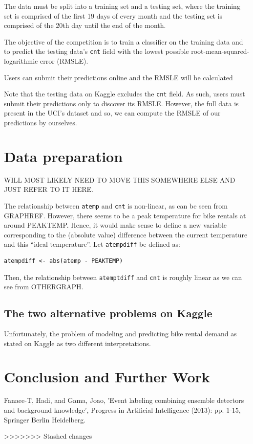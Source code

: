 \documentclass[12pt]{article}
\begin{document}
The data must be split into a training set and a testing set, where the training set is comprised of the first 19 days of every month and the testing set is comprised of the 20th day until the end of the month.

The objective of the competition is to train a classifier on the training data and to predict the testing data's \texttt{cnt} field with the lowest possible root-mean-squared-logarithmic error (RMSLE).

Users can submit their predictions online and the RMSLE will be calculated

Note that the testing data on Kaggle excludes the \texttt{cnt} field. As such, users must submit their predictions only to discover its RMSLE. However, the full data is present in the UCI's dataset and so, we can compute the RMSLE of our predictions by ourselves.

\section{Data preparation}
WILL MOST LIKELY NEED TO MOVE THIS SOMEWHERE ELSE AND JUST REFER TO IT HERE.

The relationship between \texttt{atemp} and \texttt{cnt} is non-linear, as can be seen from GRAPHREF. However, there seems to be a peak temperature for bike rentals at around PEAKTEMP. Hence, it would make sense to define a new variable corresponding to the (absolute value) difference between the current temperature and this ``ideal temperature''. Let \texttt{atempdiff} be defined as:
\begin{verbatim}
atempdiff <- abs(atemp - PEAKTEMP)
\end{verbatim}
Then, the relationship between \texttt{atemptdiff} and \texttt{cnt} is roughly linear as we can see from OTHERGRAPH.

\subsection{The two alternative problems on Kaggle}

Unfortunately, the problem of modeling and predicting bike rental demand as stated on Kaggle as two different interpretations.



\section{Conclusion and Further Work}
	\label{sec:conclusion}
	
	
	
\begin{thebibliography}{9}
		Fanaee-T, Hadi, and Gama, Joao, 'Event labeling combining ensemble detectors and background knowledge', Progress in Artificial Intelligence (2013): pp. 1-15, Springer Berlin Heidelberg.
	\end{thebibliography}
	
	>>>>>>> Stashed changes
\end{document}

